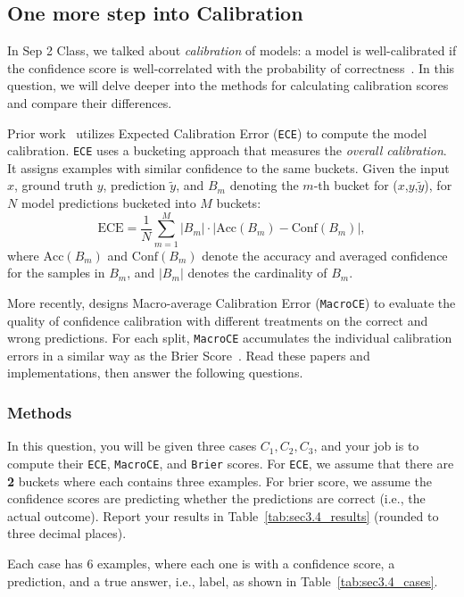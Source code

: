 \documentclass{article}
\begin{document}
\clearpage

\subsection{One more step into Calibration}

In Sep 2 Class, we talked about \textit{calibration} of models: a model is well-calibrated if the confidence score is well-correlated with the probability of correctness~\cite{niculescu2005predicting}. In this question, we will delve deeper into the methods for calculating calibration scores and compare their differences.

Prior work~\cite{guo2017calibration} utilizes Expected Calibration Error (\texttt{ECE}) to compute the model calibration. \texttt{ECE} uses a bucketing approach that measures the \emph{overall calibration}.
It assigns examples with similar confidence to the same buckets.
Given the input $x$, ground truth $y$, prediction $\tilde{y}$, and $B_m$ denoting the $m$-th bucket for ($x$,$y$,$\tilde{y}$), for $N$ model predictions bucketed into $M$ buckets: $$\text{ECE} = \frac{1}{N}\sum_{m=1}^M |B_m| \cdot |\text{Acc}(B_m) - \text{Conf}(B_m)|,$$ where $\text{Acc}(B_m)$ and $\text{Conf}(B_m)$ denote the accuracy and averaged confidence for the samples in $B_m$, and $|B_m|$ denotes the cardinality of $B_m$.

More recently, \cite{si-etal-2022-examining} designs Macro-average Calibration Error (\texttt{MacroCE}) to evaluate the quality of confidence calibration with different treatments on the correct and wrong predictions. For each split, \texttt{MacroCE} accumulates the individual calibration errors in a similar way as the Brier Score~\cite{glenn1950verification}. Read these papers and implementations, then answer the following questions.

\subsubsection{Methods}
In this question, you will be given three cases $C_1, C_2, C_3$, and your job is to compute their \texttt{ECE}, \texttt{MacroCE}, and \texttt{Brier} scores. For \texttt{ECE}, we assume that there are \textbf{2} buckets where each contains three examples. For brier score, we assume the confidence scores are predicting whether the predictions are correct (i.e., the actual outcome). Report your results in Table~\ref{tab:sec3.4_results} (rounded to three decimal places). 

Each case has 6 examples, where each one is with a confidence score, a prediction, and a true answer, i.e., label, as shown in Table~\ref{tab:sec3.4_cases}.
\end{document}

